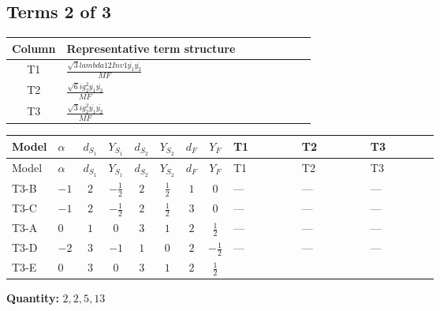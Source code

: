 \documentclass[8pt]{article}
\begin{document}
\begin{landscape}
\subsection*{Terms 2 of 3}
\begin{center}
\begin{tabular}{@{}c >{\raggedright\arraybackslash}p{0.82\linewidth}@{}}
\toprule
Column & Representative term structure \\
\midrule
T1 & \(\displaystyle \frac{\sqrt{3} lambda12Inv1 \overline{y_{1}} \overline{y_{2}}}{MF}\) \\
\midrule
T2 & \(\displaystyle \frac{\sqrt{6} i g_{2}^{2} \overline{y_{1}} \overline{y_{2}}}{MF}\) \\
\midrule
T3 & \(\displaystyle \frac{\sqrt{3} i g_{2}^{2} \overline{y_{1}} \overline{y_{2}}}{MF}\) \\
\midrule
\bottomrule
\end{tabular}
\end{center}
\smallskip
\tiny
\begin{longtable}{@{}llcccccc >{\raggedright\arraybackslash}p{0.21\linewidth} >{\raggedright\arraybackslash}p{0.21\linewidth} >{\raggedright\arraybackslash}p{0.21\linewidth}@{}}
\toprule
Model & $\alpha$ & $d_{S_1}$ & $Y_{S_1}$ & $d_{S_2}$ & $Y_{S_2}$ & $d_F$ & $Y_F$ & T1 & T2 & T3 \\
\midrule
\endfirsthead
\toprule
Model & $\alpha$ & $d_{S_1}$ & $Y_{S_1}$ & $d_{S_2}$ & $Y_{S_2}$ & $d_F$ & $Y_F$ & T1 & T2 & T3 \\
\midrule
\endhead
T3-B & $-1$ & $2$ & $-\frac{1}{2}$ & $2$ & $\frac{1}{2}$ & $1$ & $0$ & --- & --- & --- \\
\midrule
T3-C & $-1$ & $2$ & $-\frac{1}{2}$ & $2$ & $\frac{1}{2}$ & $3$ & $0$ & --- & --- & --- \\
\midrule
T3-A & $0$ & $1$ & $0$ & $3$ & $1$ & $2$ & $\frac{1}{2}$ & --- & --- & --- \\
\midrule
T3-D & $-2$ & $3$ & $-1$ & $1$ & $0$ & $2$ & $-\frac{1}{2}$ & --- & --- & --- \\
\midrule
T3-E & $0$ & $3$ & $0$ & $3$ & $1$ & $2$ & $\frac{1}{2}$ & \scriptsize\adjustbox{max width=\linewidth}{$\begin{gathered} \frac{\sqrt{3} lambda12Inv1 \overline{y_{1}} \overline{y_{2}}}{6 MF}\end{gathered}$} & \scriptsize\adjustbox{max width=\linewidth}{$\begin{gathered} \frac{\sqrt{6} i g_{2}^{2} \overline{y_{1}} \overline{y_{2}}}{3 MF}\end{gathered}$} & \scriptsize\adjustbox{max width=\linewidth}{$\begin{gathered} \frac{\sqrt{3} i g_{2}^{2} \overline{y_{1}} \overline{y_{2}}}{6 MF}\end{gathered}$} \\
\midrule
\bottomrule
\end{longtable}
\clearpage
\noindent\textbf{Quantity: }$\mathrm{2,2,5,13}$\par\smallskip

\end{landscape}
\end{document}

